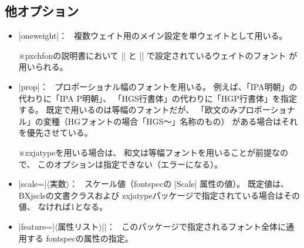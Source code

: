 \documentclass[a4paper]{bxjsarticle}
\newcommand{\Pkg}[1]{\textsf{#1}}
\newcommand{\Meta}[1]{$\langle$\mbox{}#1\mbox{}$\rangle$}
\newcommand{\Note}{\par\noindent ※}
\newcommand{\Means}{：\ }
\begin{document}
\subsection{他オプション}

\begin{itemize}
\item |oneweight|\Means
複数ウェイト用のメイン設定を単ウェイトとして用いる。
\Note \Pkg{pxchfon}の説明書において |\setminchofont|
と |\setgothicfont| で設定されているウェイトのフォント
が用いられる。

\item |prop|\Means
プロポーショナル幅のフォントを用いる。
例えば、「IPA明朝」の代わりに「IPA P明朝」、
「HGS行書体」の代わりに「HGP行書体」を指定する。
既定で用いるのは等幅のフォントだが、
「欧文のみプロポーショナル」の変種（HGフォントの場合「HGS～」名称のもの）
がある場合はそれを優先させている。
\Note \Pkg{zxjatype}を用いる場合は、
和文は等幅フォントを用いることが前提なので、
このオプションは指定できない（エラーになる）。

\item |scale=|\Meta{実数}\Means
スケール値（\Pkg{fontspec}の |Scale| 属性の値）。
既定値は、\Pkg{BXjscls}の文書クラスおよび
\Pkg{zxjatype}パッケージで指定されている場合はその値、
なければ1となる。

\item |feature={|\Meta{属性リスト}|}|\Means
このパッケージで指定されるフォント全体に通用する
\Pkg{fontspec}の属性の指定。

\end{itemize}
\end{document}
